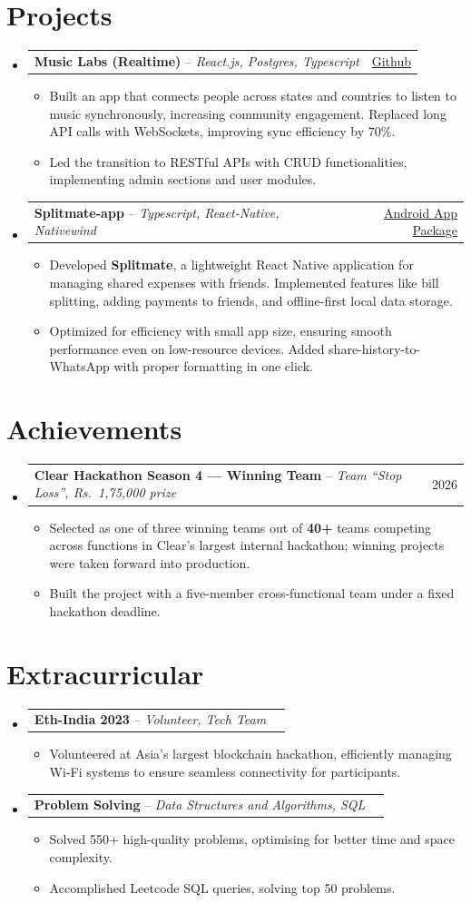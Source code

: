 \documentclass[letterpaper,11pt]{article}
\makeatletter
\newcommand{\resumeItem}[1]{
  \item\small{
    {#1}\vspace{-2pt}
  }
}
\newcommand{\expSubheading}[3]{
  \vspace{-1pt}\item
    \begin{tabular*}{0.97\textwidth}{l@{\extracolsep{\fill}}r}
      \textbf{#1} -- \textit{\small #2} & \small #3 \\
    \end{tabular*}\vspace{-5pt}
}
\newcommand{\resumeSubHeadingListStart}{\begin{itemize}[leftmargin=*]}
\newcommand{\resumeSubHeadingListEnd}{\end{itemize}}
\newcommand{\resumeItemListStart}{\begin{itemize}}
\newcommand{\resumeItemListEnd}{\end{itemize}\vspace{-5pt}}
\makeatother
\begin{document}
\section{Projects}
\resumeSubHeadingListStart
  \expSubheading
    {Music Labs (Realtime)}{React.js, Postgres, Typescript}{\href{https://github.com/noogler-eng/Music-Labs}{Github}}
    \resumeItemListStart
      \resumeItem{Built an app that connects people across states and countries to listen to music synchronously, increasing community engagement. Replaced long API calls with WebSockets, improving sync efficiency by 70\%.}
      \resumeItem{Led the transition to RESTful APIs with CRUD functionalities, implementing admin sections and user modules.}
    \resumeItemListEnd

  \expSubheading
    {Splitmate-app}{Typescript, React-Native, Nativewind}{\href{https://github.com/noogler-eng/expense-tracker}{Android App Package}}
    \resumeItemListStart
      \resumeItem{Developed \textbf{Splitmate}, a lightweight React Native application for managing shared expenses with friends. Implemented features like bill splitting, adding payments to friends, and offline-first local data storage.}
      \resumeItem{Optimized for efficiency with small app size, ensuring smooth performance even on low-resource devices. Added share-history-to-WhatsApp with proper formatting in one click.}
    \resumeItemListEnd
\resumeSubHeadingListEnd

\section{Achievements}
\resumeSubHeadingListStart
  \expSubheading
    {Clear Hackathon Season 4 --- \textbf{Winning Team}}{Team ``Stop Loss'', Rs.~1,75,000 prize}{2026}
    \resumeItemListStart
      \resumeItem{Selected as one of three winning teams out of \textbf{40+} teams competing across functions in Clear's largest internal hackathon; winning projects were taken forward into production.}
      \resumeItem{Built the project with a five-member cross-functional team under a fixed hackathon deadline.}
    \resumeItemListEnd
\resumeSubHeadingListEnd

\section{Extracurricular}
\resumeSubHeadingListStart
  \expSubheading
    {Eth-India 2023}{Volunteer, Tech Team}{}
    \resumeItemListStart
      \resumeItem{Volunteered at Asia’s largest blockchain hackathon, efficiently managing Wi-Fi systems to ensure seamless connectivity for participants.}
    \resumeItemListEnd

    \expSubheading
    {Problem Solving}{Data Structures and Algorithms, SQL}{}
    \resumeItemListStart
      \resumeItem{Solved 550+ high-quality problems, optimising for better time and space complexity.}
      \resumeItem{Accomplished Leetcode SQL queries, solving top 50 problems.}
    \resumeItemListEnd
\resumeSubHeadingListEnd

\end{document}
